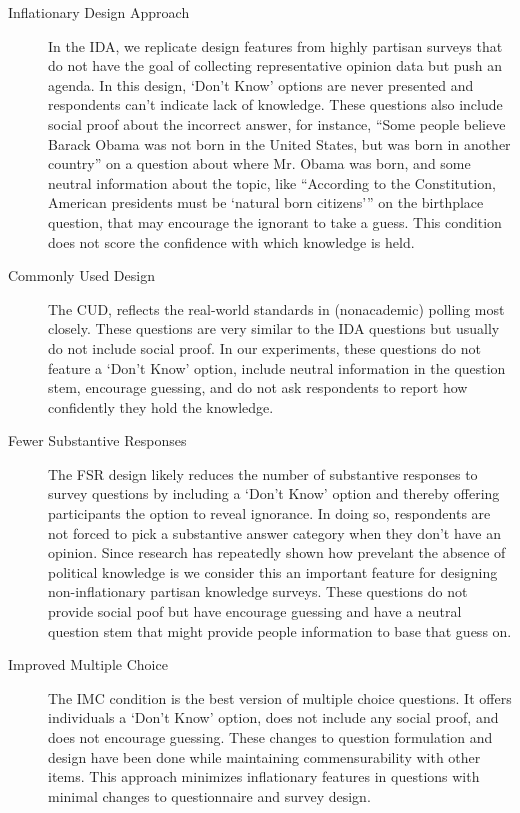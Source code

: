 \documentclass[12pt, letterpaper]{article}
\begin{document}
\begin{description}
  \item[Inflationary Design Approach] \label{txt:IDA} In the IDA, we replicate design features from highly partisan surveys that do not have the goal of collecting representative opinion data but push an agenda. In this design, `Don't Know' options are never presented and respondents can't indicate lack of knowledge. These questions also include social proof  about the incorrect answer, for instance, ``Some people believe Barack Obama was not born in the United States, but was born in another country'' on a question about where Mr. Obama was born, and some neutral information about the topic, like ``According to the Constitution, American presidents must be `natural born citizens''' on the birthplace question, that may encourage the ignorant to take a guess.  This condition does not score the confidence with which knowledge is held.
  \item[Commonly Used Design] \label{txt:CUD} The CUD, reflects the real-world standards in (nonacademic) polling most closely. These questions are very similar to the IDA questions but usually do not include social proof. In our experiments, these questions do not feature a `Don't Know' option, include neutral information in the question stem, encourage guessing, and do not ask respondents to report how confidently they hold the knowledge.
  \item[Fewer Substantive Responses] \label{txt:FSR} The FSR design likely reduces the number of substantive responses to survey questions by including a `Don't Know' option and thereby offering participants the option to reveal ignorance. In doing so, respondents are not forced to pick a substantive answer category when they don't have an opinion. Since research has repeatedly shown how prevelant the absence of political knowledge is we consider this an important feature for designing non-inflationary partisan knowledge surveys. These questions do not provide social poof but have encourage guessing and have a neutral question stem that might provide people information to base that guess on.
  \item[Improved Multiple Choice] \label{txt:IMC} The IMC condition is the best version of multiple choice questions. It offers individuals a `Don't Know' option, does not include any social proof, and does not encourage guessing. These changes to question formulation and design have been done while maintaining commensurability with other items. This approach minimizes inflationary features in questions with minimal changes to questionnaire and survey design.

\end{description}
\end{document}
